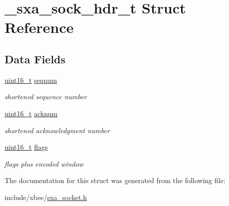 \hypertarget{struct__sxa__sock__hdr__t}{}\section{\+\_\+sxa\+\_\+sock\+\_\+hdr\+\_\+t Struct Reference}
\label{struct__sxa__sock__hdr__t}
\subsection*{Data Fields}
\begin{DoxyCompactItemize}
\item 
\mbox{\label{struct__sxa__sock__hdr__t_a90ee27660869628b83fe9e5fdeaae7b2}} 
\hyperlink{group__hal__dos_ga5a8b2dc9e45a9ee81a94ef304fb62505}{uint16\+\_\+t} \hyperlink{struct__sxa__sock__hdr__t_a90ee27660869628b83fe9e5fdeaae7b2}{seqnum}
\begin{DoxyCompactList}\small\item\em shortened sequence number \end{DoxyCompactList}\item 
\mbox{\label{struct__sxa__sock__hdr__t_a0758eb4120471bc74831dafe59b1f5c7}} 
\hyperlink{group__hal__dos_ga5a8b2dc9e45a9ee81a94ef304fb62505}{uint16\+\_\+t} \hyperlink{struct__sxa__sock__hdr__t_a0758eb4120471bc74831dafe59b1f5c7}{acknum}
\begin{DoxyCompactList}\small\item\em shortened acknowledgment number \end{DoxyCompactList}\item 
\mbox{\label{struct__sxa__sock__hdr__t_a1e87af3c18a2fd36c61faf89949bdc3f}} 
\hyperlink{group__hal__dos_ga5a8b2dc9e45a9ee81a94ef304fb62505}{uint16\+\_\+t} \hyperlink{struct__sxa__sock__hdr__t_a1e87af3c18a2fd36c61faf89949bdc3f}{flags}
\begin{DoxyCompactList}\small\item\em flags plus encoded window \end{DoxyCompactList}\end{DoxyCompactItemize}


The documentation for this struct was generated from the following file\+:\begin{DoxyCompactItemize}
\item 
include/xbee/\hyperlink{sxa__socket_8h}{sxa\+\_\+socket.\+h}\end{DoxyCompactItemize}
